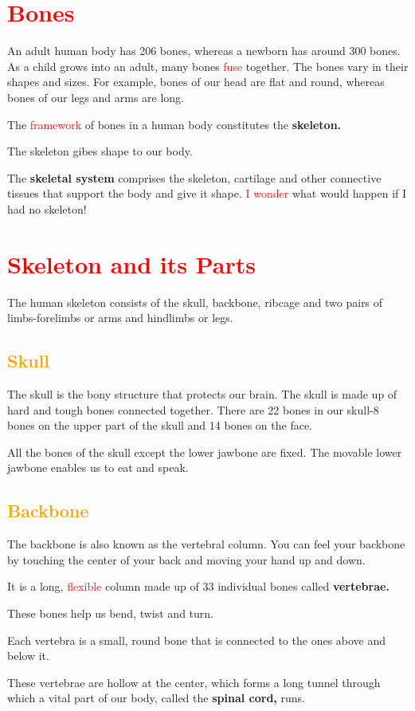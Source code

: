 \section{\textcolor{red}{Bones}}
An adult human body has 206 bones, whereas a newborn has around 300 bones. As a child grows into an adult, many bones \textcolor{red}{fuse} together. The bones vary in their shapes and sizes. For example, bones of our head are flat and round, whereas bones of our legs and arms are long.
\vspace{0.1in}
\par
The \textcolor{red}{framework} of bones in a human body constitutes the \textbf{skeleton.}
\vspace{0.1in}
\par
The skeleton gibes shape to our body.
\vspace{0.1in}
\par
The \textbf{skeletal system} comprises the skeleton, cartilage and other connective tissues that support the body and give it shape.
\vspace{0.3in}
\textcolor{red}{I wonder} what would happen if I had no skeleton!
\section{\textcolor{red}{Skeleton and its Parts}}
The human skeleton consists of the skull, backbone, ribcage and two pairs of limbs-forelimbs or arms and hindlimbs or legs.
\subsection{\textcolor{orange}{Skull}}
The skull is the bony structure that protects our brain. The skull is made up of hard and tough bones connected together. There are 22 bones in our skull-8 bones on the upper part of the skull and 14 bones on the face.
\vspace{0.1in}
\par
All the bones of the skull except the lower jawbone are fixed. The movable lower jawbone enables us to eat and speak.
\subsection{\textcolor{orange}{Backbone}}
The backbone is also known as the vertebral column. You can feel your backbone by touching the center of your back and moving your hand up and down.
\vspace{0.1in}
\par
It is a long, \textcolor{red}{flexible} column made up of 33 individual bones called \textbf{vertebrae.}
\vspace{0.1in}
\par
These bones help us bend, twist and turn.
\vspace{0.1in}
\par
Each vertebra is a small, round bone that is connected to the ones above and below it.
\vspace{0.1in}
\par
These vertebrae are hollow at the center, which forms a long tunnel through which a vital part of our body, called the \textbf{spinal cord,} runs.
